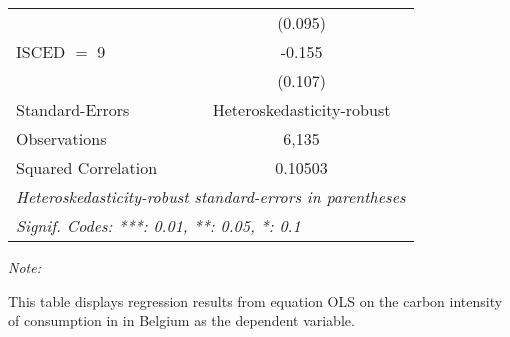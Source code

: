 \begin{table}[htbp!]
\begin{adjustbox}{width = 1\textwidth, max height = 0.95\textheight, center}
\begin{threeparttable}[b]
\begin{tabular}{lc}
                                & (0.095)\\   
            ISCED $=$ 9         & -0.155\\   
                                & (0.107)\\   
            \midrule 
            Standard-Errors     & Heteroskedasticity-robust \\   
            Observations        & 6,135\\  
            Squared Correlation & 0.10503\\  
            \midrule \midrule
            \multicolumn{2}{l}{\emph{Heteroskedasticity-robust standard-errors in parentheses}}\\
            \multicolumn{2}{l}{\emph{Signif. Codes: ***: 0.01, **: 0.05, *: 0.1}}\\
         \end{tabular}
         
         \begin{tablenotes}\item \medskip \textit{Note:}
            \item This table displays regression results from equation OLS on the carbon intensity of consumption in  in Belgium as the dependent variable. 
         \end{tablenotes}
      \end{threeparttable}
   \end{adjustbox}
\end{table}


